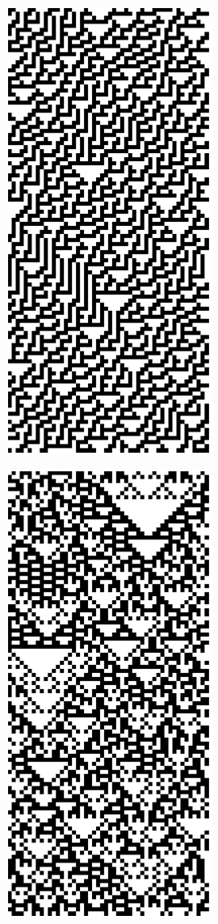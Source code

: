  \begin{figure}
	\caption{Class 1 (a,b) and 2 (c,d) elementary cellular automata}
	\label{class12}
	\centering
	\begin{subfigure}[b]{0.275\textwidth}
		\centering
		\label{fig:first}
		
		\includegraphics[scale=0.32]{./images/CA_FDM/rule30}
		\caption[]{}%
	\end{subfigure}%
	\begin{subfigure}[b]{0.275\textwidth}
		\centering
		\includegraphics[scale=0.32]{./images/CA_FDM/rule90}

\end{subfigure}
\end{figure}
